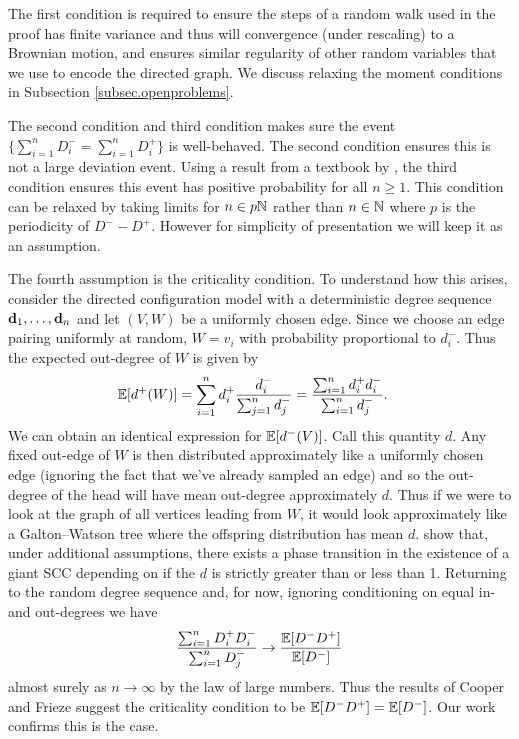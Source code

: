 The first condition is required to ensure the steps of a random walk used in the proof has finite variance and thus will convergence (under rescaling) to a Brownian motion, and ensures similar regularity of other random variables that we use to encode the directed graph. We discuss relaxing the moment conditions in Subsection \ref{subsec.openproblems}. 

The second condition and third condition makes sure the event $\{\sum_{i=1}^n D^-_i = \sum_{i=1}^n D^+_i\}$ is well-behaved. The second condition ensures this is not a large deviation event. Using a result from a textbook by \citet[Page 42, P1]{spitzerPrinciplesRandomWalk1964}, the third condition ensures this event has positive probability for all $n \geq 1$. This condition can be relaxed by taking limits for $n \in p {\mathbb N}$ rather than $n \in {\mathbb N}$ where $p$ is the periodicity of $D^- - D^+$. However for simplicity of presentation we will keep it as an assumption.

The fourth assumption is the criticality condition. To understand how this arises, consider the directed configuration model with a deterministic degree sequence ${\mathbf d}_1, \ldots, {\mathbf d}_n$ and let $(V, W)$ be a uniformly chosen edge. Since we choose an edge pairing uniformly at random, $W = v_i$ with probability proportional to $d^-_i$. Thus the expected out-degree of $W$ is given by
\begin{align*}
    {\mathbb E}[d^+(W)]
    &= \sum_{i=1}^n d_i^+ \frac{d_i^-}{\sum_{j=1}^n d_j^-}
    = \frac{\sum_{i=1}^n d_i^+ d_i^-}{\sum_{i=1}^n d_j^-}.
\end{align*}
We can obtain an identical expression for ${\mathbb E}[d^-(V)]$. Call this quantity $d$. Any fixed out-edge of $W$ is then distributed approximately like a uniformly chosen edge (ignoring the fact that we've already sampled an edge) and so the out-degree of the head will have mean out-degree approximately $d$. Thus if we were to look at the graph of all vertices leading from $W$, it would look approximately like a Galton--Watson tree where the offspring distribution has mean $d$. \citet{cooperSizeLargestStrongly2004} show that, under additional assumptions, there exists a phase transition in the existence of a giant SCC depending on if the $d$ is strictly greater than or less than 1. Returning to the random degree sequence and, for now, ignoring conditioning on equal in- and out-degrees we have
\begin{equation*}
    \frac{\sum_{i=1}^n D_i^+ D_i^-}{\sum_{i=1}^n D_j^{-}}
    \to \frac{{\mathbb E}[D^- D^+]}{{\mathbb E}[D^-]}
\end{equation*}
almost surely as $n \to \infty$ by the law of large numbers. Thus the results of Cooper and Frieze suggest the criticality condition to be ${\mathbb E}[D^- D^+] = {\mathbb E}[D^-]$. Our work confirms this is the case.


